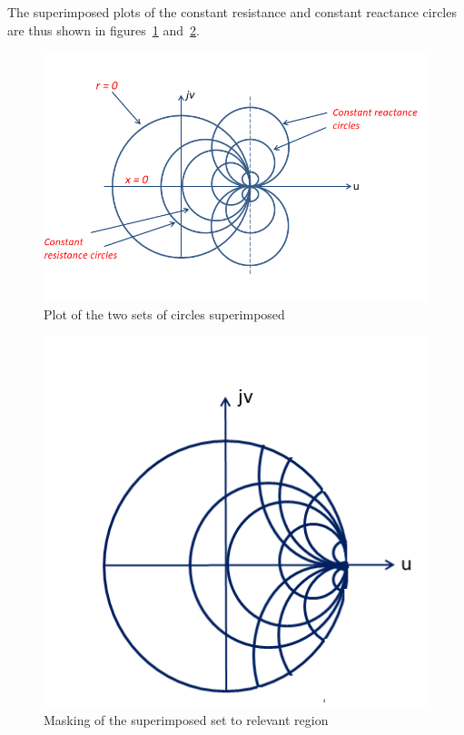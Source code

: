 The superimposed plots of the constant resistance and constant reactance circles are thus shown in figures~\ref{fig:ijnbvcxw} and~\ref{fig:sddfghj}.
\begin{figure}[h]
\centering
\includegraphics[width=1.1\linewidth]{./graphics/const_resistance_reactance_circles}
\caption{Plot of the two sets of circles superimposed}
\label{fig:ijnbvcxw}
\end{figure}
\begin{figure}[h]
\centering
\includegraphics[width=0.8\linewidth]{./graphics/relevant_region_SC}
\caption{Masking of the superimposed set to relevant region}
\label{fig:sddfghj}
\end{figure}

